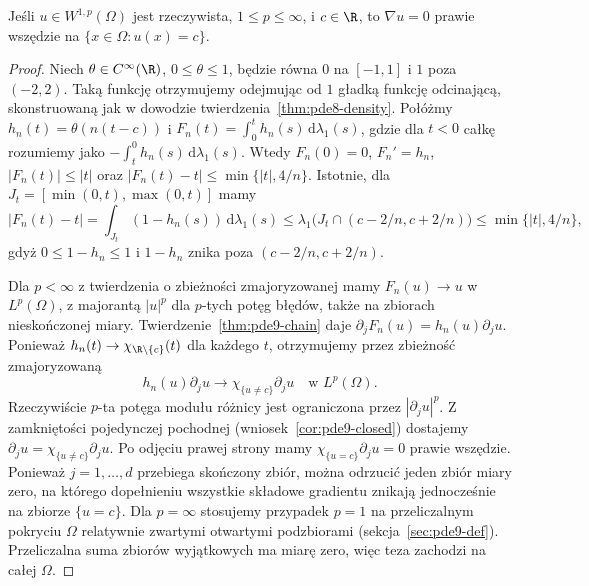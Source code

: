 \begin{lemat}
\label{lem:pde9-levelsets}
Jeśli $u\in W^{1,p}(\Omega)$ jest rzeczywista,
$1\le p\le\infty$, i $c\in\R$, to
$\nabla u=0$ prawie wszędzie na $\{x\in\Omega:u(x)=c\}$.
\end{lemat}
\begin{proof}
Niech $\theta\in C^\infty(\R)$, $0\le\theta\le1$,
będzie równa $0$ na $[-1,1]$ i $1$ poza $(-2,2)$.
Taką funkcję otrzymujemy odejmując od $1$ gładką
funkcję odcinającą, skonstruowaną jak w dowodzie
twierdzenia~\ref{thm:pde8-density}.
Połóżmy $h_n(t)=\theta(n(t-c))$ i
$F_n(t)=\int_0^t h_n(s)\,\mathrm d\lambda_1(s)$,
gdzie dla $t<0$ całkę rozumiemy jako
$-\int_t^0 h_n(s)\,\mathrm d\lambda_1(s)$.
Wtedy $F_n(0)=0$, $F_n'=h_n$, $|F_n(t)|\le|t|$
oraz $|F_n(t)-t|\le\min\{|t|,4/n\}$.
Istotnie, dla $J_t=[\min(0,t),\max(0,t)]$
mamy
\[
 |F_n(t)-t|=\int_{J_t}(1-h_n(s))\,\mathrm d\lambda_1(s)
 \le\lambda_1\bigl(J_t\cap(c-2/n,c+2/n)\bigr)
 \le\min\{|t|,4/n\},
\]
gdyż $0\le1-h_n\le1$ i $1-h_n$ znika poza
$(c-2/n,c+2/n)$.

Dla $p<\infty$ z twierdzenia o zbieżności zmajoryzowanej
mamy $F_n(u)\to u$ w $L^p(\Omega)$,
z majorantą $|u|^p$ dla $p$-tych potęg błędów,
także na zbiorach nieskończonej miary.
Twierdzenie~\ref{thm:pde9-chain} daje
$\partial_j F_n(u)=h_n(u)\partial_j u$.
Ponieważ $h_n(t)\to\chi_{\R\setminus\{c\}}(t)$ dla
każdego $t$, otrzymujemy przez zbieżność zmajoryzowaną
\[
 h_n(u)\partial_j u\longrightarrow
 \chi_{\{u\ne c\}}\partial_j u \quad\text{w }L^p(\Omega).
\]
Rzeczywiście $p$-ta potęga modułu różnicy jest
ograniczona przez $|\partial_j u|^p$.
Z zamkniętości pojedynczej pochodnej
(wniosek~\ref{cor:pde9-closed}) dostajemy
$\partial_j u=\chi_{\{u\ne c\}}\partial_j u$.
Po odjęciu prawej strony mamy
$\chi_{\{u=c\}}\partial_j u=0$ prawie wszędzie.
Ponieważ $j=1,\ldots,d$ przebiega skończony zbiór,
można odrzucić jeden zbiór miary zero, na którego
dopełnieniu wszystkie składowe gradientu znikają
jednocześnie na zbiorze $\{u=c\}$.
Dla $p=\infty$ stosujemy przypadek $p=1$
na przeliczalnym pokryciu $\Omega$ relatywnie zwartymi
otwartymi podzbiorami (sekcja~\ref{sec:pde9-def}).
Przeliczalna suma zbiorów wyjątkowych ma miarę zero,
więc teza zachodzi na całej $\Omega$.
\end{proof}

